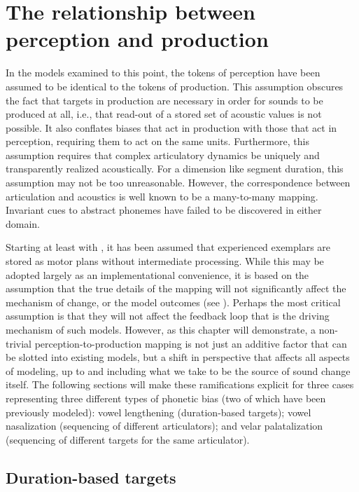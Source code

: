 \chapter{The relationship between perception and production}\label{ch:Perception-Production}

In the models examined to this point, the tokens of perception have
been assumed to be identical to the tokens of production. This assumption
obscures the fact that targets in production are necessary in order
for sounds to be produced at all, i.e., that read-out of a stored
set of acoustic values is not possible. It also conflates biases that
act in production with those that act in perception, requiring them
to act on the same units. Furthermore, this assumption requires that
complex articulatory dynamics be uniquely and transparently realized
acoustically. For a dimension like segment duration, this assumption
may not be too unreasonable. However, the correspondence between articulation
and acoustics is well known to be a many-to-many mapping. Invariant
cues to abstract phonemes have failed to be discovered in either domain. 

Starting at least with \citet{Goldinger1996}, it has been assumed
that experienced exemplars are stored as motor plans without intermediate
processing. While this may be adopted largely as an implementational
convenience, it is based on the assumption that the true details of
the mapping will not significantly affect the mechanism of change,
or the model outcomes (see \citealt{Pierrehumbert2000}). Perhaps
the most critical assumption is that they will not affect the feedback
loop that is the driving mechanism of such models. However, as this
chapter will demonstrate, a non-trivial perception-to-production mapping
is not just an additive factor that can be slotted into existing models,
but a shift in perspective that affects all aspects of modeling, up
to and including what we take to be the source of sound change itself.
The following sections will make these ramifications explicit for
three cases representing three different types of phonetic bias (two
of which have been previously modeled): vowel lengthening (duration-based
targets); vowel nasalization (sequencing of different articulators);
and velar palatalization (sequencing of different targets for the
same articulator). 

\section{Duration-based targets}

